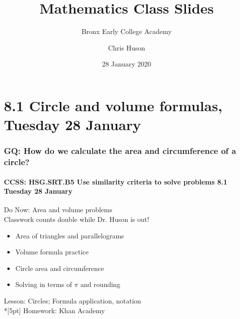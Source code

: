 \documentclass{beamer}
\title{Mathematics Class Slides}
\subtitle{Bronx Early College Academy}
\author{Chris Huson}
\date{28 January 2020}
\begin{document}
\frame{\titlepage}
\section[Outline]{}
\frame{\tableofcontents}


\section{8.1 Circle and volume formulas, Tuesday 28 January}
\frame
{
  \frametitle{GQ: How do we calculate the area and circumference of a circle?}
  \framesubtitle{CCSS: HSG.SRT.B5 Use similarity criteria to solve problems \hfill \alert{8.1 Tuesday 28 January}}

  \begin{block}{Do Now: Area and volume problems\\[0.25cm]
    \alert{Classwork counts double while Dr. Huson is out!}}
  \begin{itemize}
    \item Area of triangles and parallelograms
    \item Volume formula practice
    \item Circle area and circumference
    \item Solving in terms of $\pi$ and rounding
  \end{itemize}
  \end{block}
  Lesson: Circles; Formula application, notation\\*[5pt]
  Homework: Khan Academy
}
\end{document}
